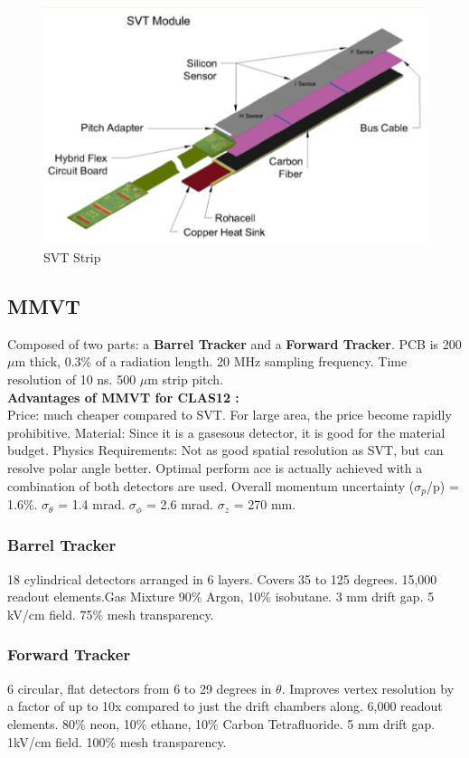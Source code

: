 			
			 \begin{figure}[H]
    			\centering
    			\includegraphics[width=12cm]{CLAS-12/modules/clas-12-system/pics/cd/svt-module.PNG}
    			\caption{SVT Strip}
			\end{figure}  
			
		
		\subsection{MMVT}
		    Composed of two parts: a \textbf{Barrel Tracker} and a \textbf{Forward Tracker}. PCB is 200 $\mu$m thick, 0.3\% of a radiation length. 20 MHz sampling frequency. Time resolution of 10 ns. 500 $\mu$m strip pitch.\\
		    \textbf{Advantages of MMVT for CLAS12 :} \\
		    Price: much cheaper compared to SVT. For large area, the price become rapidly prohibitive.
		    Material: Since it is a gasesous detector, it is good for the material budget.
		    Physics Requirements: Not as good spatial resolution as SVT, but can resolve polar angle better. Optimal perform ace is actually achieved with a combination of both detectors are used.
		    \newline
		    Overall momentum uncertainty ($\sigma_p$/p) = 1.6\%. $\sigma_{\theta}$ = 1.4 mrad.  $\sigma_{\phi}$ = 2.6 mrad.  $\sigma _{z}$ = 270 mm.  
		    \subsubsection{Barrel Tracker}
		        18 cylindrical detectors arranged in 6 layers. Covers 35 to 125 degrees. 15,000 readout elements.Gas Mixture 90\% Argon, 10\% isobutane. 3 mm drift gap. 5 kV/cm field. 75\% mesh transparency.
		    \subsubsection{Forward Tracker}
		        6 circular, flat detectors from 6 to 29 degrees in $\theta$. Improves vertex resolution by a factor of up to 10x compared to just the drift chambers along. 6,000 readout elements. 80\% neon, 10\% ethane, 10\% Carbon Tetrafluoride. 5 mm drift gap. 1kV/cm field. 100\% mesh transparency.
		        
